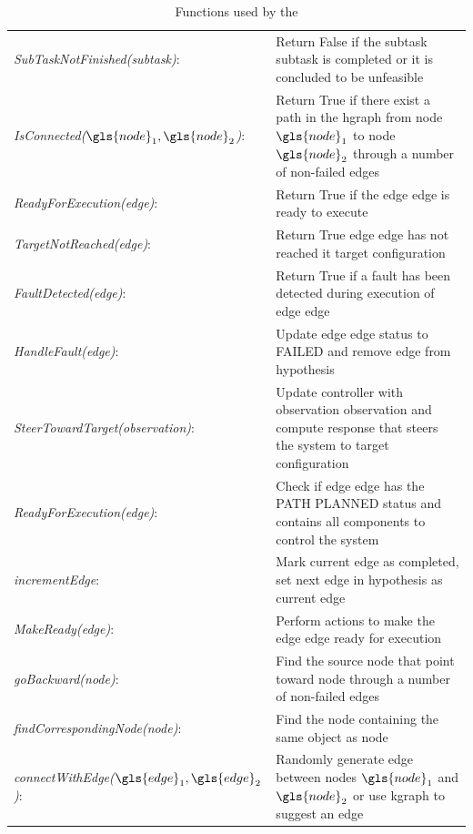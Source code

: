 \begin{table}[H]
\centering
\begin{tabular}%
  {>{\raggedright\arraybackslash}p{}%
   >{\raggedright\arraybackslash}p{}}
\textit{SubTaskNotFinished(\gls{subtask})}:& Return False if the subtask \gls{subtask} is completed or it is concluded to be unfeasible \\
\textit{IsConnected($\gls{node}_1, \gls{node}_2$)}:& Return True if there exist a path in the \ac{hgraph} from node $\gls{node}_1$  to node $\gls{node}_2$ through a number of non-failed edges\\
\textit{ReadyForExecution(\gls{edge})}: & Return True if the edge \gls{edge} is ready to execute\\
\textit{TargetNotReached(\gls{edge})}: & Return True edge \gls{edge} has not reached it target configuration\\
\textit{FaultDetected(\gls{edge})}: & Return True if a fault has been detected during execution of edge \gls{edge}\\

\textit{HandleFault(\gls{edge})}: & Update edge \gls{edge} status to FAILED and remove edge from hypothesis \\
\textit{SteerTowardTarget(\gls{observation})}: & Update controller with observation \gls{observation} and compute response that steers the system to target configuration\\
\textit{ReadyForExecution(\gls{edge})}: & Check if edge \gls{edge} has the PATH PLANNED status and contains all components to control the system \\
\textit{incrementEdge}: & Mark current edge as completed, set next edge in \gls{hypothesis} as current edge \\
\textit{MakeReady(\gls{edge})}: & Perform actions to make the edge \gls{edge} ready for execution \\
\textit{goBackward(\gls{node})}: & Find the source node that point toward \gls{node} through a number of non-failed edges\\
\textit{findCorrespondingNode(\gls{node})}: & Find the node containing the same object as \gls{node} \\
\textit{connectWithEdge($\gls{edge}_1, \gls{edge}_2$)}: & Randomly generate edge between nodes $\gls{node}_1$ and $\gls{node}_2$ or use \ac{kgraph} to suggest an edge\\
\end{tabular}
\caption{Functions used by the }
\label{table:functions_for_halgorithm}
\end{table}

